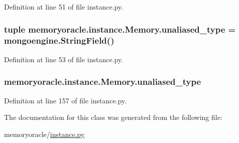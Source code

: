 Definition at line 51 of file instance.\+py.

\hypertarget{classmemoryoracle_1_1instance_1_1Memory_abaa6ef3e2ff8451350f47b2c4795f5eb}{}
\subsubsection[{unaliased\+\_\+type}]{\setlength{\rightskip}{0pt plus 5cm}tuple memoryoracle.\+instance.\+Memory.\+unaliased\+\_\+type = mongoengine.\+String\+Field()\hspace{0.3cm}{\ttfamily [static]}}\label{classmemoryoracle_1_1instance_1_1Memory_abaa6ef3e2ff8451350f47b2c4795f5eb}


Definition at line 53 of file instance.\+py.

\hypertarget{classmemoryoracle_1_1instance_1_1Memory_ac7778b85299f2e28765771174a43b1cd}{}
\subsubsection[{unaliased\+\_\+type}]{\setlength{\rightskip}{0pt plus 5cm}memoryoracle.\+instance.\+Memory.\+unaliased\+\_\+type}\label{classmemoryoracle_1_1instance_1_1Memory_ac7778b85299f2e28765771174a43b1cd}


Definition at line 157 of file instance.\+py.



The documentation for this class was generated from the following file\+:\begin{DoxyCompactItemize}
\item 
memoryoracle/\hyperlink{instance_8py}{instance.\+py}\end{DoxyCompactItemize}
